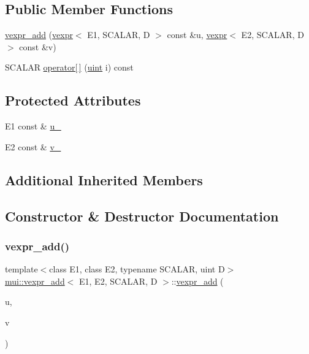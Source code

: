 \subsection*{Public Member Functions}
\begin{DoxyCompactItemize}
\item 
\hyperlink{structmui_1_1vexpr__add_ac01994e977ef207be2566f8aae67f80e}{vexpr\+\_\+add} (\hyperlink{structmui_1_1vexpr}{vexpr}$<$ E1, S\+C\+A\+L\+AR, D $>$ const \&u, \hyperlink{structmui_1_1vexpr}{vexpr}$<$ E2, S\+C\+A\+L\+AR, D $>$ const \&v)
\item 
S\+C\+A\+L\+AR \hyperlink{structmui_1_1vexpr__add_a9e6b72fecc4b5dc3d5b985bf772bbcf5}{operator\mbox{[}$\,$\mbox{]}} (\hyperlink{namespacemui_af15a3e7188a2117fb9965277bb0cacd2}{uint} i) const
\end{DoxyCompactItemize}
\subsection*{Protected Attributes}
\begin{DoxyCompactItemize}
\item 
E1 const  \& \hyperlink{structmui_1_1vexpr__add_aacc5ddf4b6997a5e395865677d14e4d8}{u\+\_\+}
\item 
E2 const  \& \hyperlink{structmui_1_1vexpr__add_aaaab45c08aabf1d92dc4aee8cec469a4}{v\+\_\+}
\end{DoxyCompactItemize}
\subsection*{Additional Inherited Members}


\subsection{Constructor \& Destructor Documentation}
\mbox{\label{structmui_1_1vexpr__add_ac01994e977ef207be2566f8aae67f80e}} 
\subsubsection{\texorpdfstring{vexpr\+\_\+add()}{vexpr\_add()}}
{\footnotesize\ttfamily template$<$class E1, class E2, typename S\+C\+A\+L\+AR, uint D$>$ \\
\hyperlink{structmui_1_1vexpr__add}{mui\+::vexpr\+\_\+add}$<$ E1, E2, S\+C\+A\+L\+AR, D $>$\+::\hyperlink{structmui_1_1vexpr__add}{vexpr\+\_\+add} (\begin{DoxyParamCaption}\item[{\hyperlink{structmui_1_1vexpr}{vexpr}$<$ E1, S\+C\+A\+L\+AR, D $>$ const \&}]{u,  }\item[{\hyperlink{structmui_1_1vexpr}{vexpr}$<$ E2, S\+C\+A\+L\+AR, D $>$ const \&}]{v }\end{DoxyParamCaption})\hspace{0.3cm}{\ttfamily [inline]}}



